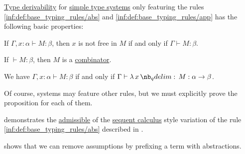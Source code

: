 \begin{proposition}\label{thm:def:simple_type_derivability}
  \hyperref[def:simple_type_derivability]{Type derivability} for \hyperref[def:simple_type_system]{simple type systems} only featuring the rules \ref{inf:def:base_typing_rules/abs} and \ref{inf:def:base_typing_rules/app} has the following basic properties:
  \begin{thmenum}
     If \( \Gamma, x: \alpha \vdash M: \beta \), then \( x \) is not free in \( M \) if and only if \( \Gamma \vdash M: \beta \).

     If \( {}\vdash M: \beta \), then \( M \) is a \hyperref[def:lambda_combinator]{combinator}.

     We have \( \Gamma, x: \alpha \vdash M: \beta \) if and only if \( \Gamma \vdash \qabs x M: \alpha \to \beta \).
  \end{thmenum}
\end{proposition}
\begin{comments}
  \item Of course, systems may feature other rules, but we must explicitly prove the proposition for each of them.

  \item {} demonstrates the \hyperref[con:inference_rule_admissibility]{admissible} of the \hyperref[rem:sequent_calculus]{sequent calculus} style variation of the rule \ref{inf:def:base_typing_rules/abs} described in .

  \item {} shows that we can remove assumptions by prefixing a term with abstractions.
\end{comments}

